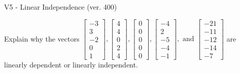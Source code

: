 \begin{exercise}
  \begin{exerciseTitle}V5 - Linear Independence (ver. 400)\end{exerciseTitle}
  \begin{exerciseStatement}
    Explain why the vectors \(\left[\begin{array}{r}
-3 \\
3 \\
-2 \\
0 \\
1
\end{array}\right] , \left[\begin{array}{r}
4 \\
4 \\
0 \\
2 \\
4
\end{array}\right] , \left[\begin{array}{r}
0 \\
0 \\
0 \\
0 \\
0
\end{array}\right] , \left[\begin{array}{r}
-4 \\
2 \\
-5 \\
-4 \\
-1
\end{array}\right] , \text{ and } \left[\begin{array}{r}
-21 \\
-11 \\
-12 \\
-14 \\
-7
\end{array}\right]\) are linearly dependent or linearly independent.	



\end{exerciseStatement}
\end{exercise}
